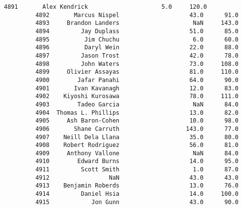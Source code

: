 \documentclass[11pt]{article}
\begin{document}
\begin{Verbatim}[commandchars=\\\{\}]
         4891       Alex Kendrick                     5.0     120.0   
         4892       Marcus Nispel                    43.0      91.0   
         4893     Brandon Landers                     NaN     143.0   
         4894         Jay Duplass                    51.0      85.0   
         4895          Jim Chuchu                     6.0      60.0   
         4896          Daryl Wein                    22.0      88.0   
         4897         Jason Trost                    42.0      78.0   
         4898         John Waters                    73.0     108.0   
         4899     Olivier Assayas                    81.0     110.0   
         4900        Jafar Panahi                    64.0      90.0   
         4901       Ivan Kavanagh                    12.0      83.0   
         4902    Kiyoshi Kurosawa                    78.0     111.0   
         4903        Tadeo Garcia                     NaN      84.0   
         4904  Thomas L. Phillips                    13.0      82.0   
         4905     Ash Baron-Cohen                    10.0      98.0   
         4906       Shane Carruth                   143.0      77.0   
         4907    Neill Dela Llana                    35.0      80.0   
         4908    Robert Rodriguez                    56.0      81.0   
         4909     Anthony Vallone                     NaN      84.0   
         4910        Edward Burns                    14.0      95.0   
         4911         Scott Smith                     1.0      87.0   
         4912                 NaN                    43.0      43.0   
         4913    Benjamin Roberds                    13.0      76.0   
         4914         Daniel Hsia                    14.0     100.0   
         4915            Jon Gunn                    43.0      90.0   
         

\end{Verbatim}
\end{document}
